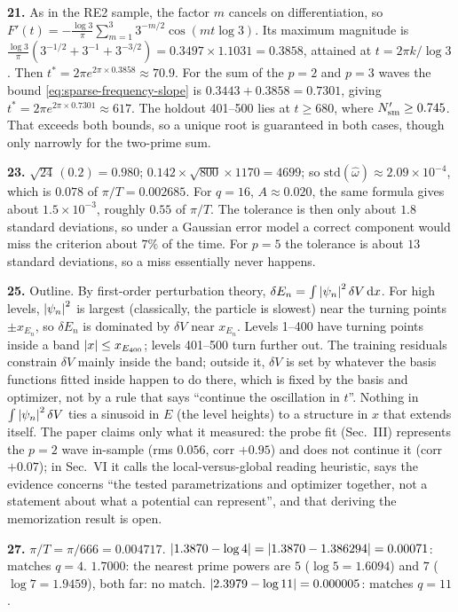 \textbf{21.} As in the RE2 sample, the factor $m$ cancels on differentiation, so $F'(t)=-\frac{\log3}{\pi}\sum_{m=1}^3 3^{-m/2}\cos(mt\log3)$. Its maximum magnitude is $\frac{\log3}{\pi}(3^{-1/2}+3^{-1}+3^{-3/2})=0.3497\times1.1031=0.3858$, attained at $t=2\pi k/\log3$. Then $t^*=2\pi e^{2\pi\times0.3858}\approx70.9$. For the sum of the $p=2$ and $p=3$ waves the bound \eqref{eq:sparse-frequency-slope} is $0.3443+0.3858=0.7301$, giving $t^*=2\pi e^{2\pi\times0.7301}\approx617$. The holdout 401--500 lies at $t\ge680$, where $N_{\mathrm{sm}}'\ge0.745$. That exceeds both bounds, so a unique root is guaranteed in both cases, though only narrowly for the two-prime sum.

\textbf{23.} $\sqrt{24}\,(0.2)=0.980$; $0.142\times\sqrt{800}\times1170=4699$; so $\mathrm{std}(\widehat\omega)\approx2.09\times10^{-4}$, which is $0.078$ of $\pi/T=0.002685$. For $q=16$, $A\approx0.020$, the same formula gives about $1.5\times10^{-3}$, roughly $0.55$ of $\pi/T$. The tolerance is then only about $1.8$ standard deviations, so under a Gaussian error model a correct component would miss the criterion about $7\%$ of the time. For $p=5$ the tolerance is about $13$ standard deviations, so a miss essentially never happens.

\textbf{25.} Outline. By first-order perturbation theory, $\delta E_n=\int\left\lvert \psi_n\right\rvert^2\delta V\,\mathrm{d} x$. For high levels, $\left\lvert \psi_n\right\rvert^2$ is largest (classically, the particle is slowest) near the turning points $\pm x_{E_n}$, so $\delta E_n$ is dominated by $\delta V$ near $x_{E_n}$. Levels 1--400 have turning points inside a band $\left\lvert x\right\rvert\le x_{E_{400}}$; levels 401--500 turn further out. The training residuals constrain $\delta V$ mainly inside the band; outside it, $\delta V$ is set by whatever the basis functions fitted inside happen to do there, which is fixed by the basis and optimizer, not by a rule that says ``continue the oscillation in $t$''. Nothing in $\int\left\lvert \psi_n\right\rvert^2\delta V$ ties a sinusoid in $E$ (the level heights) to a structure in $x$ that extends itself. The paper claims only what it measured: the probe fit (Sec.~III) represents the $p=2$ wave in-sample (rms $0.056$, corr $+0.95$) and does not continue it (corr $+0.07$); in Sec.~VI it calls the local-versus-global reading heuristic, says the evidence concerns ``the tested parametrizations and optimizer together, not a statement about what a potential can represent'', and that deriving the memorization result is open.

\textbf{27.} $\pi/T=\pi/666=0.004717$. $\left\lvert 1.3870-\log4\right\rvert=\left\lvert 1.3870-1.386294\right\rvert=0.00071$: matches $q=4$. $1.7000$: the nearest prime powers are $5$ ($\log5=1.6094$) and $7$ ($\log7=1.9459$), both far: no match. $\left\lvert 2.3979-\log11\right\rvert=0.000005$: matches $q=11$.
